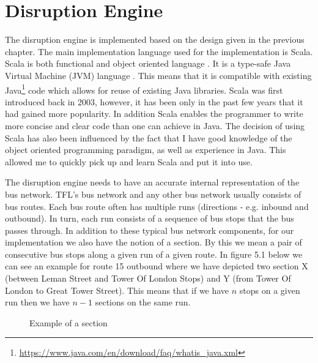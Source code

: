 \section{Disruption Engine}
The disruption engine is implemented based on the design given in the previous chapter. The main implementation language used for the implementation is Scala. Scala is both functional and object oriented language \cite{odersky2008programming}. It is a type-safe Java Virtual Machine (JVM) language \cite{odersky2008programming}. This means that it is compatible with existing Java\footnote{\url{https://www.java.com/en/download/faq/whatis_java.xml}} code which allows for reuse of existing Java libraries. Scala was first introduced back in 2003, however, it has been only in the past few years that it had gained more popularity. In addition Scala enables the programmer to write more concise and clear code than one can achieve in Java. The decision of using Scala has also been influenced by the fact that I have good knowledge of the object oriented programming paradigm, as well as experience in Java. This allowed me to quickly pick up and learn Scala and put it into use.

The disruption engine needs to have an accurate internal representation of the bus network. TFL's bus network and any other bus network usually consists of bus routes. Each bus route often has multiple runs (directions - e.g. inbound and outbound). In turn, each run consists of a sequence of bus stops that the bus passes through. In addition to these typical bus network components, for our implementation we also have the notion of a section. By this we mean a pair of consecutive bus stops along a given run of a given route. In figure 5.1 below we can see an example for route 15 outbound where we have depicted two section X (between Leman Street and Tower Of London Stops) and Y (from Tower Of London to Great Tower Street). This means that if we have $n$ stops on a given run then we have $n-1$ sections on the same run.

\begin{figure}[ht]
	\caption{Example of a section}
	\label{fig:sectionExample}
\end{figure}

